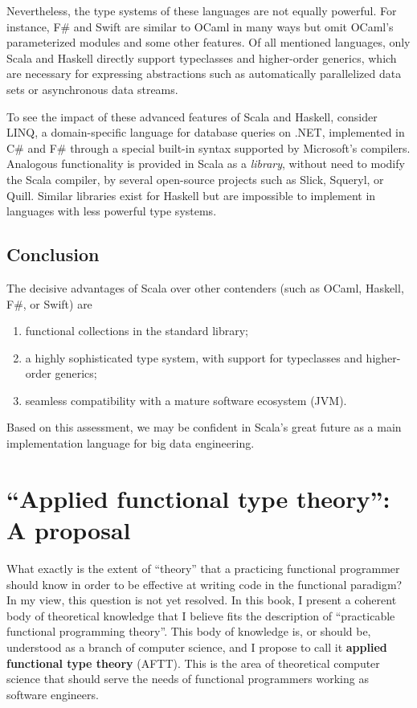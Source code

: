Nevertheless, the type systems of these languages are not equally
powerful. For instance, F\# and Swift are similar to OCaml in many
ways but omit OCaml's parameterized modules and some other features.
Of all mentioned languages, only Scala and Haskell directly support
typeclasses and higher-order generics, which are necessary for expressing
abstractions such as automatically parallelized data sets or asynchronous
data streams.

To see the impact of these advanced features of Scala and Haskell,
consider LINQ, a domain-specific language for database queries on
.NET, implemented in C\# and F\# through a special built-in syntax
supported by Microsoft's compilers. Analogous functionality is provided
in Scala as a \emph{library}, without need to modify the Scala compiler,
by several open-source projects such as Slick, Squeryl, or Quill.
Similar libraries exist for Haskell \textendash{} but are impossible
to implement in languages with less powerful type systems.

\section{Conclusion}

The decisive advantages of Scala over other contenders (such as OCaml,
Haskell, F\#, or Swift) are
\begin{enumerate}
\item functional collections in the standard library;
\item a highly sophisticated type system, with support for typeclasses and
higher-order generics; 
\item seamless compatibility with a mature software ecosystem (JVM). 
\end{enumerate}
Based on this assessment, we may be confident in Scala's great future
as a main implementation language for big data engineering. 

\chapter{``Applied functional type theory'': A proposal}

What exactly is the extent of ``theory'' that a practicing functional
programmer should know in order to be effective at writing code in
the functional paradigm? In my view, this question is not yet resolved.
In this book, I present a coherent body of theoretical knowledge that
I believe fits the description of ``practicable functional programming
theory''. This body of knowledge is, or should be, understood as
a branch of computer science, and I propose to call it\textbf{ applied
functional type theory} (AFTT). This is the area of theoretical computer
science that should serve the needs of functional programmers working
as software engineers.

